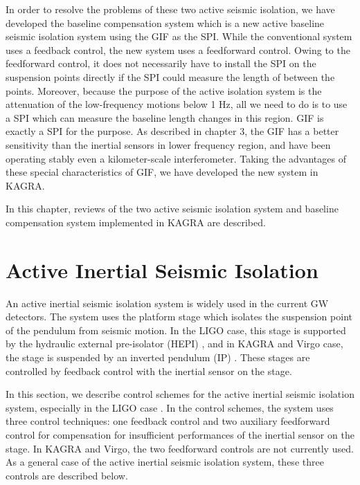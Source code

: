 In order to resolve the problems of these two active seismic isolation, we have developed the baseline compensation system which is a new active baseline seismic isolation system using the GIF as the SPI. While the conventional system uses a feedback control, the new system uses a feedforward control. Owing to the feedforward control, it does not necessarily have to install the SPI on the suspension points directly if the SPI could measure the length of between the points. Moreover, because the purpose of the active isolation system is the attenuation of the low-frequency motions below 1 Hz, all we need to do is to use a SPI which can measure the baseline length changes in this region. GIF is exactly a SPI for the purpose. As described in chapter 3, the GIF has a better sensitivity than the inertial sensors in lower frequency region, and have been operating stably even a kilometer-scale interferometer. Taking the advantages of these special characteristics of GIF, we have developed the new system in KAGRA. 

In this chapter, reviews of the two active seismic isolation system and baseline compensation system implemented in KAGRA are described. 


\section{Active Inertial Seismic Isolation}\label{sec:52}
An active inertial seismic isolation system is widely used in the current GW detectors. The system uses the platform stage which isolates the suspension point of the pendulum from seismic motion. In the LIGO case, this stage is supported by the hydraulic external pre-isolator (HEPI) \cite{wen2014hydraulic}, and in KAGRA and Virgo case, the stage is suspended by an inverted pendulum (IP) \cite{Braccini2002,Okutomi2019development}. These stages are controlled by feedback control with the inertial sensor on the stage. 

In this section, we describe control schemes for the active inertial seismic isolation system, especially in the LIGO case \cite{matichard2015seismic}. In the control schemes, the system uses three control techniques: one feedback control and two auxiliary feedforward control for compensation for insufficient performances of the inertial sensor on the stage. In KAGRA and Virgo, the two feedforward controls are not currently used. As a general case of the active inertial seismic isolation system, these three controls are described below.

